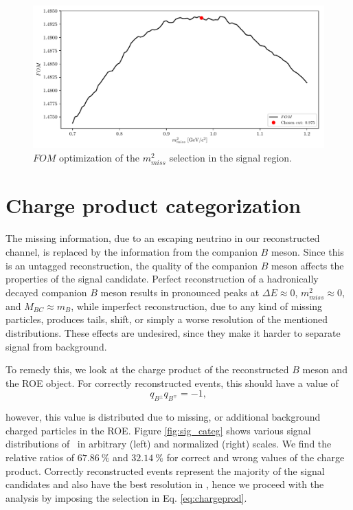 \begin{figure}[H]
	\centering
	\captionsetup{width=0.8\linewidth}
	\includegraphics[width=\linewidth]{fig/missM2_precise}
	\caption{$FOM$ optimization of the $m_{miss}^2$ selection in the signal region.}
	\label{fig:missm2opt}
\end{figure}

\newpage
\section{Charge product categorization}\label{sec:event-categorization}

The missing information, due to an escaping neutrino in our reconstructed channel, is replaced by the information from the companion $B$ meson. Since this is an untagged reconstruction, the quality of the companion $B$ meson affects the properties of the signal candidate. Perfect reconstruction of a hadronically decayed companion $B$ meson results in pronounced peaks at $\Delta E \approx 0$, $m_{miss}^2 \approx 0$, and $M_{BC} \approx m_B$, while imperfect reconstruction, due to any kind of missing particles, produces tails, shift, or simply a worse resolution of the mentioned distributions. These effects are undesired, since they make it harder to separate signal from background.

To remedy this, we look at the charge product of the reconstructed $B$ meson and the ROE object. For correctly reconstructed events, this should have a value of 
\begin{equation}
\label{eq:chargeprod}
q_{B^\pm}q_{B^\mp} = -1,
\end{equation}

however, this value is distributed due to missing, or additional background charged particles in the ROE. Figure \ref{fig:sig_categ} shows various signal distributions of \vars~in arbitrary (left) and normalized (right) scales. We find the relative ratios of $67.86~\%$ and $32.14~\%$ for correct and wrong values of the charge product. Correctly reconstructed events represent the majority of the signal candidates and also have the best resolution in \vars, hence we proceed with the analysis by imposing the selection in Eq. \ref{eq:chargeprod}.

